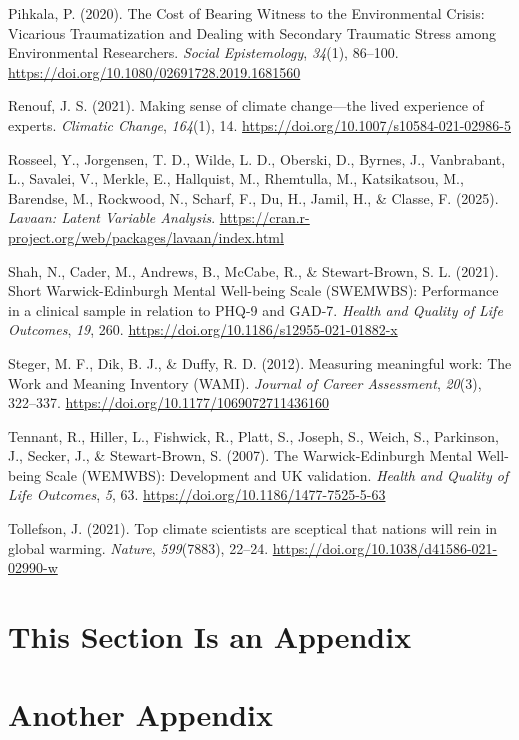 \documentclass[
  man,
  longtable,
  nolmodern,
  notxfonts,
  notimes,
  colorlinks=true,linkcolor=blue,citecolor=blue,urlcolor=blue]{apa7}
\newlength{\cslhangindent}
\newenvironment{CSLReferences}[2] %
 {\begin{list}{}{%
  \setlength{\itemindent}{0pt}
  \setlength{\leftmargin}{0pt}
  \setlength{\parsep}{0pt}
  \ifodd #1
   \setlength{\leftmargin}{\cslhangindent}
   \setlength{\itemindent}{-1\cslhangindent}
  \fi
  \setlength{\itemsep}{#2\baselineskip}}}
 {\end{list}}
\begin{document}
\begin{CSLReferences}{1}{0}
Pihkala, P. (2020). The {Cost} of {Bearing} {Witness} to the
{Environmental} {Crisis}: {Vicarious} {Traumatization} and {Dealing}
with {Secondary} {Traumatic} {Stress} among {Environmental}
{Researchers}. \emph{Social Epistemology}, \emph{34}(1), 86--100.
\url{https://doi.org/10.1080/02691728.2019.1681560}

Renouf, J. S. (2021). Making sense of climate change---the lived
experience of experts. \emph{Climatic Change}, \emph{164}(1), 14.
\url{https://doi.org/10.1007/s10584-021-02986-5}

Rosseel, Y., Jorgensen, T. D., Wilde, L. D., Oberski, D., Byrnes, J.,
Vanbrabant, L., Savalei, V., Merkle, E., Hallquist, M., Rhemtulla, M.,
Katsikatsou, M., Barendse, M., Rockwood, N., Scharf, F., Du, H., Jamil,
H., \& Classe, F. (2025). \emph{Lavaan: {Latent} {Variable} {Analysis}}.
\url{https://cran.r-project.org/web/packages/lavaan/index.html}

Shah, N., Cader, M., Andrews, B., McCabe, R., \& Stewart-Brown, S. L.
(2021). Short {Warwick}-{Edinburgh} {Mental} {Well}-being {Scale}
({SWEMWBS}): Performance in a clinical sample in relation to {PHQ}-9 and
{GAD}-7. \emph{Health and Quality of Life Outcomes}, \emph{19}, 260.
\url{https://doi.org/10.1186/s12955-021-01882-x}

Steger, M. F., Dik, B. J., \& Duffy, R. D. (2012). Measuring meaningful
work: {The} {Work} and {Meaning} {Inventory} ({WAMI}). \emph{Journal of
Career Assessment}, \emph{20}(3), 322--337.
\url{https://doi.org/10.1177/1069072711436160}

Tennant, R., Hiller, L., Fishwick, R., Platt, S., Joseph, S., Weich, S.,
Parkinson, J., Secker, J., \& Stewart-Brown, S. (2007). The
{Warwick}-{Edinburgh} {Mental} {Well}-being {Scale} ({WEMWBS}):
Development and {UK} validation. \emph{Health and Quality of Life
Outcomes}, \emph{5}, 63. \url{https://doi.org/10.1186/1477-7525-5-63}

Tollefson, J. (2021). Top climate scientists are sceptical that nations
will rein in global warming. \emph{Nature}, \emph{599}(7883), 22--24.
\url{https://doi.org/10.1038/d41586-021-02990-w}

\end{CSLReferences}

\appendix

\section{This Section Is an Appendix}\label{apx-a}

\section{Another Appendix}\label{apx-b}
\end{document}
